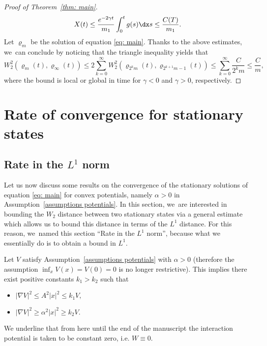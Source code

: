 \begin{proof}[Proof of Theorem~\ref{thm: main}]
\begin{equation*}
X(t) \leq \frac{e^{-2\gamma t}}{m_1}\int_0^t g(s)\dx s\leq \frac{C(T)}{m_1}.
\end{equation*}
Let $\varrho_m$ be the solution of equation \eqref{eq: main}. Thanks to the above estimates, we~can conclude by noticing that the triangle inequality yields that
\begin{equation*}
W_2^2(\varrho_m(t), \varrho_\infty(t)) {\le 2} \sum_{k=0}^{\infty} W_2^2(\varrho_{2^km}(t), \varrho_{2^{k+1} m-1}(t)) \leq \sum_{k=0}^{\infty} \frac{C}{2^{k} m} \leq \frac{C}{m},
\end{equation*}
where the bound is local or global in time for $\gamma<0$ and $\gamma>0$, respectively.
\end{proof}

\section{Rate of convergence for stationary states}\label{sec:5}

\subsection{Rate in the $L^1$ norm }

Let us now discuss some results on the convergence of the stationary solutions of equation \eqref{eq: main} for convex potentials, namely $\alpha>0$ in Assumption~\ref{assumptions potentials}.
In this section, we~are interested in bounding the $W_2$ distance between two stationary states via a general estimate which allows us to bound this distance in terms of the $L^1$ distance. For this reason, we~named this section ``Rate in the $L^1$ norm'', because what we essentially do is to obtain a bound in $L^1$.

\begin{remark}
Let $V$ satisfy Assumption~\ref{assumptions potentials} with $\alpha>0$ (therefore the assumption $\inf_x V(x)=V(0)=0$ is no longer restrictive). This implies there exist positive constants $k_1> k_2$ such that
\begin{itemize}
\item $ |\nabla V|^2 \leq A^2 |x|^2 \leq k_1 V,$
\item $|\nabla V|^2 \geq \alpha^2 |x|^2 \geq k_2 V.$
\end{itemize}
We underline that from here until the end of the manuscript the interaction potential is taken to be constant zero, i.e. $W\equiv 0$.
\end{remark}

